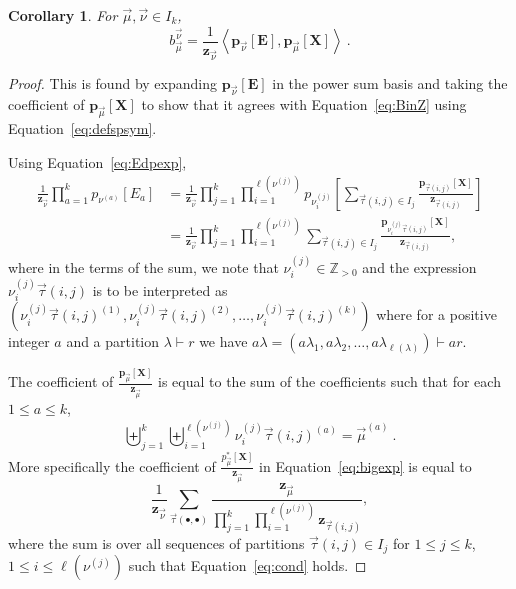 \documentclass[10pt]{amsart}
\newtheorem{cor}[theorem]{Corollary}
\theoremstyle{definition}
\theoremstyle{remark}
\newcommand{\ZZ}{\mathbb Z}
\newcommand{\XXX}{\mathbf{X}}
\newcommand{\EEE}{\mathbf{E}}
\begin{document}
\begin{cor}\label{cor:bscalar}
For $\vec{\mu}, \vec{\nu} \in I_k$,
\begin{equation}\label{eq:sfbcoef}
b_{\vec{\mu}}^{\vec{\nu}}
= \frac{1}{\mathbf{z}_{\vec{\nu}}}\left< \mathbf{p}_{\vec{\nu}}[\EEE], \mathbf{p}_{\vec{\mu}}[\XXX] \right>~.
\end{equation}
\end{cor}
\begin{proof}
This is found by expanding $\mathbf{p}_{\vec{\nu}}[\EEE]$
in the power sum basis and taking the coefficient of $\mathbf{p}_{\vec{\mu}}[\XXX]$
to show that it agrees with Equation~\eqref{eq:BinZ} using Equation~\eqref{eq:defspsym}.

Using Equation~\eqref{eq:Edpexp},
\begin{align}
\frac{1}{\mathbf{z}_{\vec{\nu}}} \prod_{a=1}^k p_{\nu^{(a)}}[E_a]
&=
\frac{1}{\mathbf{z}_{\vec{\nu}}} \prod_{j=1}^k
\prod_{i=1}^{\ell(\nu^{(j)})} p_{\nu^{(j)}_i}\left[
\sum_{\vec{\tau}(i,j) \in I_j}
\frac{\mathbf{p}_{\vec{\tau}(i,j)}[\XXX]}{\mathbf{z}_{\vec{\tau}(i,j)}}\right]\\
&=\label{eq:bigexp}
\frac{1}{\mathbf{z}_{\vec{\nu}}} \prod_{j=1}^k
\prod_{i=1}^{\ell(\nu^{(j)})}
\sum_{\vec{\tau}(i,j) \in I_j}
\frac{\mathbf{p}_{\nu^{(j)}_i\vec{\tau}(i,j)}[\XXX]}{\mathbf{z}_{\vec{\tau}(i,j)}},
\end{align}
where in the terms of the sum, we note that $\nu^{(j)}_i \in \ZZ_{>0}$
and the expression $\nu^{(j)}_i\vec{\tau}(i,j)$ is to be interpreted
as $( \nu^{(j)}_i \vec{\tau}(i,j)^{(1)}, \nu^{(j)}_i \vec{\tau}(i,j)^{(2)},
\ldots, \nu^{(j)}_i \vec{\tau}(i,j)^{(k)})$ where for a positive integer $a$
and a partition $\lambda \vdash r$ we have
$a \lambda = (a \lambda_1, a \lambda_2,
\ldots, a \lambda_{\ell(\lambda)})\vdash ar$.

The coefficient of $\frac{\mathbf{p}_{\vec{\mu}}[\XXX]}{\mathbf{z}_{\vec{\mu}}}$
is equal to the sum of the coefficients such that
for each $1 \leqslant a \leqslant k$,
\begin{equation}\label{eq:cond}
    \biguplus_{j=1}^k \biguplus_{i=1}^{\ell(\nu^{(j)})} \nu^{(j)}_i\vec{\tau}(i,j)^{(a)} = \vec{\mu}^{(a)}~.
\end{equation}
More specifically the coefficient of $\frac{p^\ast_{\vec{\mu}}[\XXX]}{\mathbf{z}_{\vec{\mu}}}$
in Equation~\eqref{eq:bigexp} is equal to
\begin{equation}\label{eq:coeffp}
    \frac{1}{\mathbf{z}_{\vec{\nu}}}
    \sum_{\vec{\tau}(\bullet,\bullet)}
    \frac{\mathbf{z}_{\vec{\mu}}}
    {\prod_{j=1}^k \prod_{i=1}^{\ell(\nu^{(j)})} \mathbf{z}_{\vec{\tau}(i,j)}},
\end{equation}
where the sum is over all sequences of partitions $\vec{\tau}(i,j) \in I_j$ for $1\leqslant j \leqslant k$,
$1 \leqslant i \leqslant \ell(\nu^{(j)})$ such that
Equation~\eqref{eq:cond} holds.
\end{proof}
\end{document}
